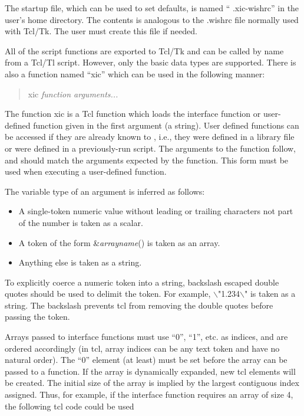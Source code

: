 The startup file, which can be used to set defaults, is named ``{\vt
.xic-wishrc}'' in the user's home directory.  The contents is
analogous to the {\vt .wishrc} file normally used with Tcl/Tk.  The
user must create this file if needed.

All of the {\Xic} script functions are exported to Tcl/Tk and can be
called by name from a Tcl/Tl script.  However, only the basic data
types are supported.  There is also a function named ``{\vt xic}''
which can be used in the following manner:
\begin{quote}
{\vt xic} {\it function arguments...}
\end{quote}

The function {\vt xic} is a Tcl function which loads the interface
function or user-defined function given in the first argument (a
string).  User defined functions can be accessed if they are already
known to {\Xic}, i.e., they were defined in a library file or were
defined in a previously-run {\Xic} script.  The arguments to the
function follow, and should match the arguments expected by the
function.  This form must be used when executing a user-defined
function.

The variable type of an argument is inferred as follows:
\begin{itemize}
\item{A single-token numeric value without leading or trailing
characters not part of the number is taken as a scalar.}
\item{A token of the form \&{\it arrayname}() is taken as an array.}
\item{Anything else is taken as a string.}
\end{itemize}

To explicitly coerce a numeric token into a string, backslash escaped
double quotes should be used to delimit the token.  For example, {\vt
$\backslash$"1.234$\backslash$"} is taken as a string.  The backslash
prevents {\et tcl} from removing the double quotes before passing the
token.

Arrays passed to interface functions must use ``0'', ``1'', etc.  as
indices, and are ordered accordingly (in {\et tcl}, array indices can
be any text token and have no natural order).  The ``0'' element (at
least) must be set before the array can be passed to a function.  If
the array is dynamically expanded, new {\et tcl} elements will be
created.  The initial size of the array is implied by the largest
contiguous index assigned.  Thus, for example, if the interface
function requires an array of size 4, the following {\et tcl} code
could be used

